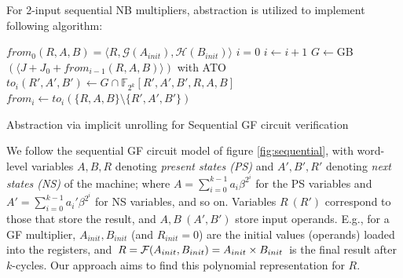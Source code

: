 For 2-input sequential NB multipliers, abstraction is utilized to implement following algorithm:
\IncMargin{1em}
\begin{algorithm}[hbt]
\SetAlgoNoLine
\LinesNumbered

  $from_0(R,A,B) = \langle R, \mathcal{G}(A_{init}), \mathcal{H}(B_{init})\rangle$\;
  $i = 0$\;
  {
  	$i \gets i + 1$\;
	$G \gets$GB$( \langle J + J_0+ from_{i-1}(R,A,B) \rangle
    )$ with ATO\;
	$to_i(R',A',B')\gets G\cap \mathbb F_{2^k}[R',A',B',R,A,B]$\;
	$from_i \gets to_i(\{R,A,B\}\setminus \{R',A',B'\})$\;
  }
\caption {Abstraction via implicit unrolling for Sequential GF circuit
  verification}
\label{alg:modified}
\end{algorithm}
\DecMargin{1em}

\begin{figure}[H]
\end{figure}

We follow  the sequential GF circuit model of
figure \ref{fig:sequential}, with word-level variables $A, B, R$
denoting {\it present states (PS)} and $A', B', R'$ denoting {\it next
  states (NS)} of the machine; where $A = \sum_{i=0}^{k-1} a_i \beta^{2^i}$
for the PS variables and $A' = \sum_{i=0}^{k-1} a_i'
\beta^{2^i}$ for NS variables, and so on.  Variables $R\ (R')$ correspond to those that 
store the result, and $A, B\ (A', B')$ store input operands. E.g.,
for a GF multiplier, $A_{init}, B_{init}$ (and $R_{init} =
0$) are the initial values (operands) loaded into the registers,  and
$R = {\mathcal{F}}(A_{init}, B_{init}) = A_{init} \times B_{init}$ is the final
result after $k$-cycles. Our approach aims to find this polynomial
representation for $R$.  

